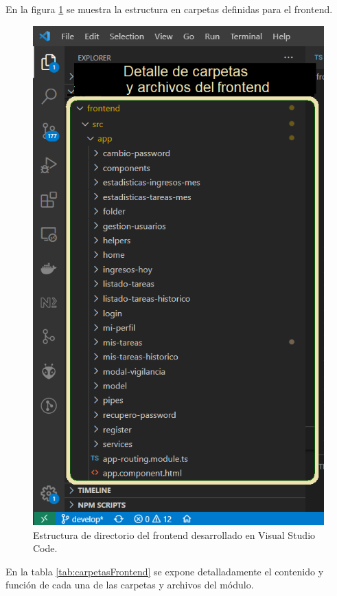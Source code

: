 \pagebreak
En la figura \ref{fig:frontendCarpetas} se muestra la estructura en carpetas definidas para el frontend.

\begin{figure}[ht]
	\centering
	\includegraphics[width=.6\textwidth]{./Figures/frontendCarpetas.png}
	\caption{Estructura de directorio del frontend desarrollado en Visual Studio Code.}
	\label{fig:frontendCarpetas}
\end{figure}


En la tabla \ref{tab:carpetasFrontend}  se expone detalladamente el contenido y función de cada una de las carpetas y archivos del módulo.

